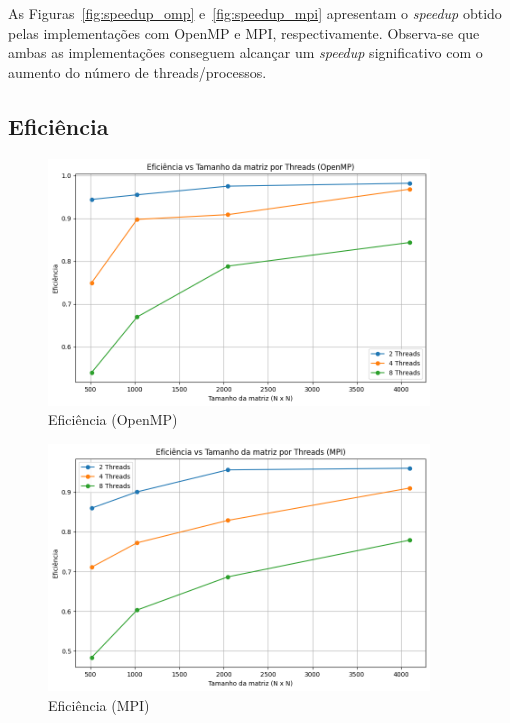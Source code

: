 \documentclass[12pt, a4paper]{article}
\begin{document}
    As Figuras~\ref{fig:speedup_omp} e~\ref{fig:speedup_mpi} apresentam o \emph{speedup} obtido pelas implementações com OpenMP e MPI, respectivamente. Observa-se que ambas as implementações conseguem alcançar um \emph{speedup} significativo com o aumento do número de threads/processos.

    \subsection{Eficiência}

    \begin{figure}[H]
        \centering
        \includegraphics[width=0.9\textwidth]{img/efficiency-openmp.png}
        \caption{Eficiência (OpenMP)}\label{fig:eficiencia_omp}
    \end{figure}

    \begin{figure}[H]
        \centering
        \includegraphics[width=0.9\textwidth]{img/efficiency-mpi.png}
        \caption{Eficiência (MPI)}\label{fig:eficiencia_mpi}
    \end{figure}
\end{document}
